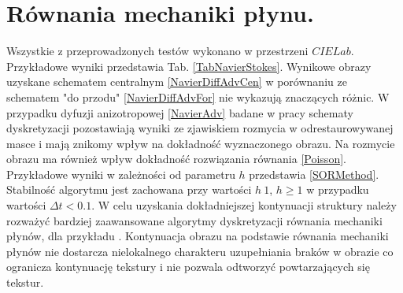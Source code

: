\documentclass[12pt, twoside, openany]{report}
\theoremstyle{definition}
\begin{document}
\section{Równania mechaniki płynu.}
Wszystkie z przeprowadzonych testów wykonano w przestrzeni $CIELab$. Przykładowe wyniki  przedstawia Tab. \ref{TabNavierStokes}. Wynikowe obrazy uzyskane schematem centralnym \eqref{NavierDiffAdvCen} w porównaniu ze schematem "do przodu" \eqref{NavierDiffAdvFor} nie wykazują znaczących różnic. W przypadku dyfuzji anizotropowej \eqref{NavierAdv}  badane w pracy  schematy dyskretyzacji pozostawiają wyniki ze zjawiskiem rozmycia w odrestaurowywanej masce i mają znikomy wpływ na dokładność wyznaczonego obrazu. Na rozmycie obrazu ma również wpływ dokładność rozwiązania równania \eqref{Poisson}. Przykładowe wyniki w zależności od parametru $h$  przedstawia \autoref{SORMethod}. Stabilność algorytmu jest zachowana przy wartości $h~1$, $h \geq1$ w przypadku wartości $\Delta t <0.1$. W celu uzyskania dokładniejszej kontynuacji struktury należy rozważyć bardziej zaawansowane algorytmy dyskretyzacji równania mechaniki płynów, dla przykładu \cite{tschumperle2006fast}. Kontynuacja obrazu na podstawie równania mechaniki płynów nie dostarcza nielokalnego charakteru uzupełniania braków w obrazie co ogranicza kontynuację tekstury i nie pozwala odtworzyć powtarzających się tekstur.
\end{document}
